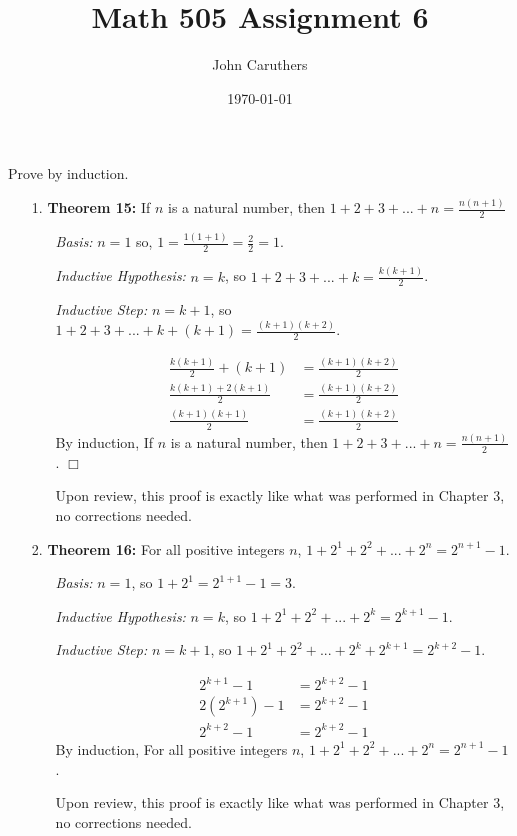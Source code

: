 \documentclass{article}
\title{Math 505 Assignment 6}
\author{John Caruthers}
\date\today
\begin{document}
\maketitle

Prove by induction.
\begin{itemize}

    \item[1.] \textbf{Theorem 15:} If $n$ is a natural number, then $1+2+3+...+n=\frac{n(n+1)}{2}$
    
    \begin{itemize}
        \item[]\emph{Basis:} $n=1$ so, $1=\frac{1(1+1)}{2}=\frac{2}{2}=1$.
        
        \item[]\emph{Inductive Hypothesis:} $n=k$, so $1+2+3+...+k=\frac{k(k+1)}{2}$.
        
        \item[]\emph{Inductive Step:} $n=k+1$, so $1+2+3+...+k+(k+1)=\frac{(k+1)(k+2)}{2}$.
        
        \begin{align}
            \frac{k(k+1)}{2}+(k+1)&=\frac{(k+1)(k+2)}{2}\nonumber\\
            \frac{k(k+1)+2(k+1)}{2}&=\frac{(k+1)(k+2)}{2}\nonumber\\
            \frac{(k+1)(k+1)}{2}&=\frac{(k+1)(k+2)}{2}\nonumber
        \end{align}
        By induction, If $n$ is a natural number, then $1+2+3+...+n=\frac{n(n+1)}{2}$. $\Box$
        
        {\color{blue} Upon review, this proof is exactly like what was performed in Chapter 3, no corrections needed.}
        
    \end{itemize}
    
    \item[2.] \textbf{Theorem 16:} For all positive integers $n$, $1+2^1+2^2+...+2^n=2^{n+1}-1$.
    
    \begin{itemize}
        \item[]\emph{Basis:} $n=1$, so $1+2^1=2^{1+1}-1=3$.
        
        \item[]\emph{Inductive Hypothesis:} $n=k$, so $1+2^1+2^2+...+2^k=2^{k+1}-1$.
        
        \item[]\emph{Inductive Step:} $n=k+1$, so $1+2^1+2^2+...+2^k+2^{k+1}=2^{k+2}-1$.
        
        \begin{align}
            2^{k+1}-1&=2^{k+2}-1\nonumber\\
            2(2^{k+1})-1&=2^{k+2}-1\nonumber\\
            2^{k+2}-1&=2^{k+2}-1\nonumber
        \end{align}
        By induction, For all positive integers $n$, $1+2^1+2^2+...+2^n=2^{n+1}-1$.
        
        {\color{blue} Upon review, this proof is exactly like what was performed in Chapter 3, no corrections needed.}
    \end{itemize}
    
\end{itemize}
\end{document}
